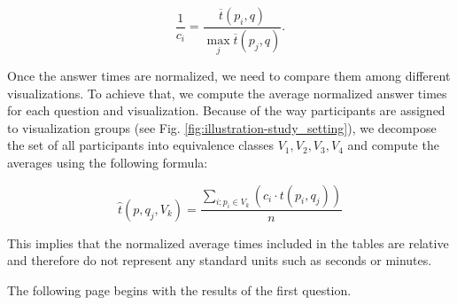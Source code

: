 \[\frac{1}{c_i} = \frac{\overline{t}(p_i,q)}{{\max_{j} \overline{t}(p_j,q)}}.\] 

Once the answer times are normalized, we need to compare them among different visualizations. To achieve that, we compute the average normalized answer times for each question and visualization. Because of the way participants are assigned to visualization groups (see Fig. \ref{fig:illustration-study_setting}), we decompose the set of all participants into equivalence classes \(V_1,V_2,V_3,V_4\) and compute the averages using the following formula:

\[\widehat{t}(p,q_j,V_k) = \frac{\sum_{i; p_i \in V_k}^{}(c_i \cdot t(p_i,q_j))}{n}\]

This implies that the normalized average times included in the tables are relative and therefore do not represent any standard units such as seconds or minutes.

The following page begins with the results of the first question.
\clearpage

